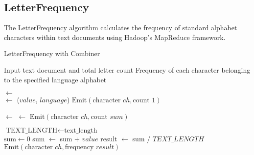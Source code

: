 \newpage

\subsection{LetterFrequency}
The LetterFrequency algorithm calculates the frequency of standard alphabet characters within text documents using Hadoop's MapReduce framework. \\


\begin{algorithm}
    \caption{LetterFrequency with Combiner}
    \begin{algorithmic}[1]
        \Require Input text document and total letter count
        \Ensure Frequency of each character belonging to the specified language alphabet

        \Statex
                \State {} $\gets$  
            \EndMethod\\

                \State {} $\gets$ ($value$, $language$) 
                    \State $\text{Emit}(\text{character $ch$}, \text{count $1$})$ 
                \EndFor
            \EndMethod
        \EndClass

        \Statex
                \State {} $\gets$  
                 
                    \State {} $\gets$ 
                \EndFor
                \State $\text{Emit}(\text{character $ch$}, \text{count $sum$})$ 
            \EndMethod
        \EndClass

        \Statex
                \State $\text{TEXT\_LENGTH} \gets \text{text\_length}$ 
            \EndMethod\\

                \State $\text{sum} \gets 0$
                 
                    \State sum $\gets$ sum + $value$
                \EndFor
                \State result $\gets$ sum / $TEXT\_LENGTH$ 
                \State $\text{Emit}(\text{character $ch$}, \text{frequency $result$})$ 
            \EndMethod
        \EndClass

    \end{algorithmic}
\end{algorithm}


